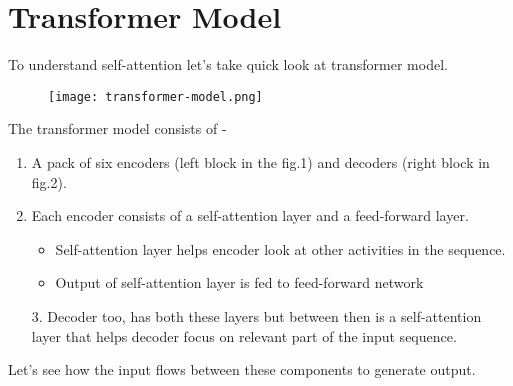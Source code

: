\documentclass[11pt]{article}
\begin{document}
\section{Transformer Model}

To understand self-attention let's take quick look at transformer model.

\begin{figure}[!h]
	\begin{center}
  \texttt{[image: transformer-model.png]}
  \label{fig:transformer-model}
  	\end{center}
\end{figure}

The transformer model consists of - 
	\begin{enumerate}
		\item A pack of six encoders (left block in the fig.1) and decoders (right block in fig.2).
		\item Each encoder consists of a self-attention layer and a feed-forward layer.
		\begin{itemize}
				\item Self-attention layer helps encoder look at other activities in the sequence.
				\item Output of self-attention layer is fed to feed-forward network
		\end{itemize}

3.	Decoder too, has both these layers but between then is a self-attention layer that helps decoder focus on relevant part of the input sequence.

	\end{enumerate}

Let’s see how the input flows between these components to generate output.
\end{document}
